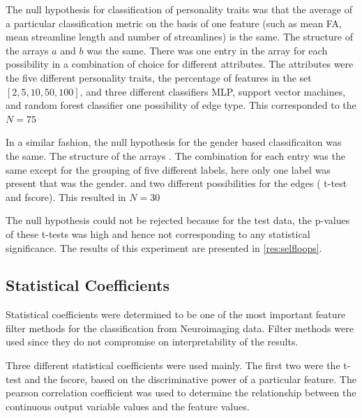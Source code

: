\documentclass[msthesis.tex]{subfiles}
\begin{document}
The null hypothesis for classification of personality traits was that the average of a particular classification metric on the basis of one feature (such as mean FA, mean streamline length  and number of streamlines) is the same. The structure of the arrays $a$ and $b$ was the same.  There was one entry in the array for each possibility in a combination of choice for different attributes. The attributes were the five different personality traits, the percentage of features in the set $[2,5,10,50,100]$, and three different classifiers MLP, support vector machines, and random forest classifier one possibility of edge type. This corresponded to the $N=75$

In a similar fashion, the null hypothesis for the gender based classificaiton was the same. The structure of the arrays . The combination for each entry was the same except for the grouping of five different labels, here only one label was present that was the gender. and two different possibilities for the edges ( t-test and fscore).  This resulted in $N=$30


The null hypothesis could not be rejected because for the test data, the p-values of these t-tests was high and hence not corresponding to any statistical significance. The results of this experiment are presented in  \autoref{res:selfloops}. 

\subsection{Statistical Coefficients}
\label{subsub:statcoef}

Statistical coefficients were determined to be one of the most important feature filter methods for the classification from Neuroimaging data. Filter methods were used since they do not compromise on interpretability of the results.

Three different statistical coefficients were used mainly. The first two were the t-test and the fscore, based on the discriminative power of a particular feature. The pearson correlation coefficient was used to determine the relationship between the continuous output variable values and the feature values. 
\end{document}
